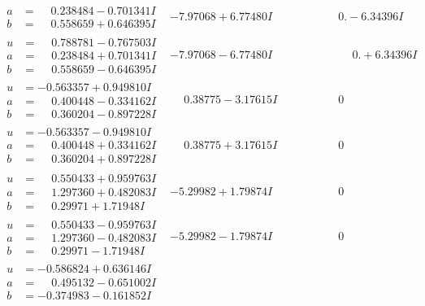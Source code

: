 \documentclass[1p]{elsarticle_modified}
\theoremstyle{definition}
\begin{document}
$$\begin{array}{c|c|c}
\begin{aligned}
a &= \phantom{-}0.238484 - 0.701341 I \\
b &= \phantom{-}0.558659 + 0.646395 I\end{aligned}
 & -7.97068 + 6.77480 I & \phantom{-0.000000 } 0. - 6.34396 I \\ \hline\begin{aligned}
u &= \phantom{-}0.788781 - 0.767503 I \\
a &= \phantom{-}0.238484 + 0.701341 I \\
b &= \phantom{-}0.558659 - 0.646395 I\end{aligned}
 & -7.97068 - 6.77480 I & \phantom{-0.000000 -}0. + 6.34396 I \\ \hline\begin{aligned}
u &= -0.563357 + 0.949810 I \\
a &= \phantom{-}0.400448 - 0.334162 I \\
b &= \phantom{-}0.360204 - 0.897228 I\end{aligned}
 & \phantom{-}0.38775 - 3.17615 I & \phantom{-0.000000 } 0 \\ \hline\begin{aligned}
u &= -0.563357 - 0.949810 I \\
a &= \phantom{-}0.400448 + 0.334162 I \\
b &= \phantom{-}0.360204 + 0.897228 I\end{aligned}
 & \phantom{-}0.38775 + 3.17615 I & \phantom{-0.000000 } 0 \\ \hline\begin{aligned}
u &= \phantom{-}0.550433 + 0.959763 I \\
a &= \phantom{-}1.297360 + 0.482083 I \\
b &= \phantom{-}0.29971 + 1.71948 I\end{aligned}
 & -5.29982 + 1.79874 I & \phantom{-0.000000 } 0 \\ \hline\begin{aligned}
u &= \phantom{-}0.550433 - 0.959763 I \\
a &= \phantom{-}1.297360 - 0.482083 I \\
b &= \phantom{-}0.29971 - 1.71948 I\end{aligned}
 & -5.29982 - 1.79874 I & \phantom{-0.000000 } 0 \\ \hline\begin{aligned}
u &= -0.586824 + 0.636146 I \\
a &= \phantom{-}0.495132 - 0.651002 I \\
b &= -0.374983 - 0.161852 I\end{aligned}

\end{array}$$
\end{document}
